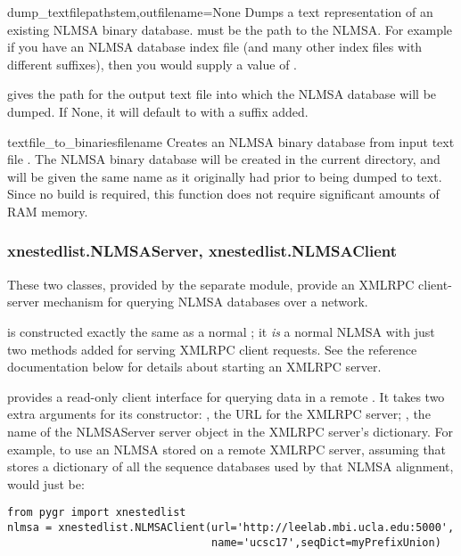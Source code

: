 \documentclass{howto}
\begin{document}
\begin{funcdesc}{dump_textfile}{pathstem,outfilename=None}
  Dumps a text representation of an existing NLMSA binary database.
   must be the path to the NLMSA.  For
  example if you have an NLMSA database index file 
  (and many other index files with different suffixes),
  then you would supply a  value of .

   gives the path for the output text file into which the
  NLMSA database will be dumped.  If None, it will default to  with a
   suffix added.
\end{funcdesc}


\begin{funcdesc}{textfile_to_binaries}{filename}
  Creates an NLMSA binary database from input text file .
  The NLMSA binary database will be created in the current directory,
  and will be given the same name as it originally had prior to being dumped to text.
  Since no build is required, this function does not require significant amounts
  of RAM memory.
\end{funcdesc}



\subsubsection{xnestedlist.NLMSAServer, xnestedlist.NLMSAClient}
These two classes, provided by the separate  module,
provide an XMLRPC client-server mechanism for querying NLMSA databases
over a network.  

 is constructed exactly the same as a normal ;
it {\em is} a normal NLMSA with just two methods added for serving XMLRPC client
requests.  See the  reference 
documentation below for details about starting an XMLRPC server.

 provides a read-only client interface for querying
data in a remote .  It takes two extra arguments for
its constructor: , the URL for the XMLRPC server; ,
the name of the NLMSAServer server object in the XMLRPC server's dictionary.
For example, to use an NLMSA stored on a remote XMLRPC server,
assuming that  stores a dictionary of all the
sequence databases used by that NLMSA alignment, would just be:
\begin{verbatim}
from pygr import xnestedlist
nlmsa = xnestedlist.NLMSAClient(url='http://leelab.mbi.ucla.edu:5000',
                                name='ucsc17',seqDict=myPrefixUnion)
\end{verbatim}
\end{document}
